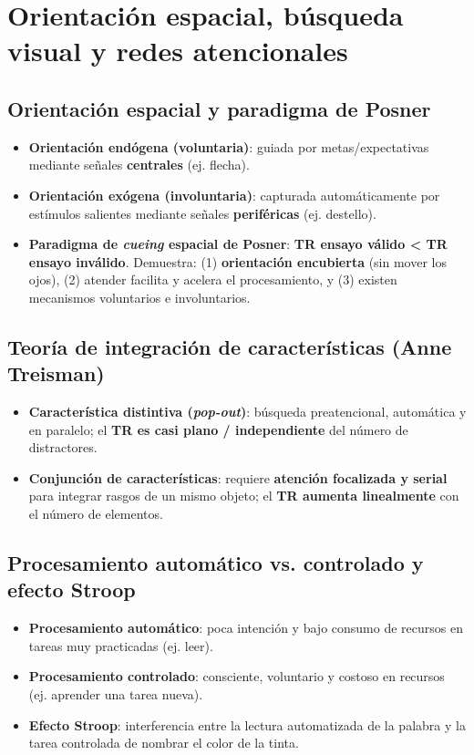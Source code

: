 \documentclass[11pt,a4paper]{article}
\begin{document}
\section{Orientación espacial, búsqueda visual y redes atencionales}

\subsection*{Orientación espacial y paradigma de Posner}
\begin{itemize}
  \item \textbf{Orientación endógena (voluntaria)}: guiada por metas/expectativas mediante señales \textbf{centrales} (ej. flecha).
  \item \textbf{Orientación exógena (involuntaria)}: capturada automáticamente por estímulos salientes mediante señales \textbf{periféricas} (ej. destello).
  \item \textbf{Paradigma de \textit{cueing} espacial de Posner}: \textbf{TR ensayo válido < TR ensayo inválido}. Demuestra: (1) \textbf{orientación encubierta} (sin mover los ojos), (2) atender facilita y acelera el procesamiento, y (3) existen mecanismos voluntarios e involuntarios.
\end{itemize}

\subsection*{Teoría de integración de características (Anne Treisman)}
\begin{itemize}
  \item \textbf{Característica distintiva (\textit{pop-out})}: búsqueda preatencional, automática y en paralelo; el \textbf{TR es casi plano / independiente} del número de distractores.
  \item \textbf{Conjunción de características}: requiere \textbf{atención focalizada y serial} para integrar rasgos de un mismo objeto; el \textbf{TR aumenta linealmente} con el número de elementos.
\end{itemize}

\subsection*{Procesamiento automático vs. controlado y efecto Stroop}
\begin{itemize}
  \item \textbf{Procesamiento automático}: poca intención y bajo consumo de recursos en tareas muy practicadas (ej. leer).
  \item \textbf{Procesamiento controlado}: consciente, voluntario y costoso en recursos (ej. aprender una tarea nueva).
  \item \textbf{Efecto Stroop}: interferencia entre la lectura automatizada de la palabra y la tarea controlada de nombrar el color de la tinta.
\end{itemize}
\end{document}
